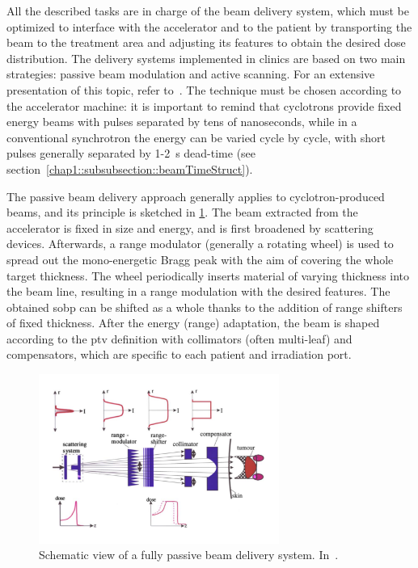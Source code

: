 All the described tasks are in charge of the beam delivery system, which must be optimized to interface with the accelerator and to the patient by transporting the beam to the treatment area and adjusting its features to obtain the desired dose distribution. 
The delivery systems implemented in clinics are based on two main strategies: passive beam modulation and active scanning. For an extensive presentation of this topic, refer to~\cite{Gottschalk2008}. The technique must be chosen according to the accelerator machine: it is important to remind that cyclotrons provide fixed energy beams with pulses separated by tens of nanoseconds, while in a conventional synchrotron the energy can be varied cycle by cycle, with short pulses generally separated by 1-2~s dead-time (see section~\ref{chap1::subsubsection::beamTimeStruct}). 

The passive beam delivery approach  generally applies to cyclotron-produced beams, and its principle is sketched in \figurename\ref{chap1::fig::passiveDelivery}. The beam extracted from the accelerator is fixed in size and energy, and is first broadened by scattering devices. Afterwards, a range modulator (generally a rotating wheel) is used to spread out the mono-energetic Bragg peak with the aim of covering the whole target thickness. The wheel periodically inserts material of varying thickness into the beam line, resulting in a range modulation with the desired features. The obtained \gls{sobp} can be shifted as a whole thanks to the addition of range shifters of fixed thickness. After the energy (range) adaptation, the beam is shaped according to the \gls{ptv} definition with collimators (often multi-leaf) and compensators, which are specific to each patient and irradiation port.  

\begin{figure}[!htbp]
\centering
\includegraphics[width=0.7\textwidth]{03_GraphicFiles/chapter1_Introduction/passiveDelivery.pdf}
\caption{Schematic view of a fully passive beam delivery system. In~\cite{Schardt2010}.}
\label{chap1::fig::passiveDelivery}
\end{figure} 

